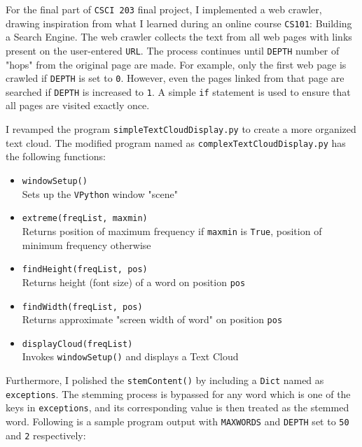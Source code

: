 \documentclass[12pt,letterpaper]{article}
\begin{document}
\date{}
\maketitle
\vspace{-12mm}

\thispagestyle{fancy}

For the final part of \texttt{CSCI 203} final project, I implemented a web crawler, drawing inspiration from what I learned during an online course \texttt{CS101}: Building a Search Engine. The web crawler collects the text from all web pages with links present on the user-entered \texttt{URL}. The process continues until \texttt{DEPTH} number of "hops" from the original page are made. For example, only the first web page is crawled if \texttt{DEPTH} is set to \texttt{0}. However, even the pages linked from that page are searched if \texttt{DEPTH} is increased to \texttt{1}. A simple \texttt{if} statement is used to ensure that all pages are visited exactly once.

I revamped the program \texttt{simpleTextCloudDisplay.py} to create a more organized text cloud. The modified program named as \texttt{complexTextCloudDisplay.py} has the following functions:

\vspace{-4mm}
\begin{itemize}
    \item \texttt{windowSetup()} \\
        Sets up the \texttt{VPython} window "scene"
    \item \texttt{extreme(freqList, max\textunderscore min)} \\
        Returns position of maximum frequency if \texttt{max\textunderscore min} is \texttt{True}, position of minimum frequency otherwise
    \item \texttt{findHeight(freqList, pos)} \\
        Returns height (font size) of a word on position \texttt{pos}
    \item \texttt{findWidth(freqList, pos)} \\
        Returns approximate "screen width of word" on position \texttt{pos}
    \item \texttt{displayCloud(freqList)} \\
       Invokes \texttt{windowSetup()} and displays a Text Cloud 
\end{itemize}

Furthermore, I polished the \texttt{stemContent()} by including a \texttt{Dict} named as \texttt{exceptions}. The stemming process is bypassed for any word which is one of the keys in \texttt{exceptions}, and its corresponding value is then treated as the stemmed word. Following is a sample program output with \texttt{MAX\textunderscore WORDS} and \texttt{DEPTH} set to \texttt{50} and \texttt{2} respectively:
\end{document}
